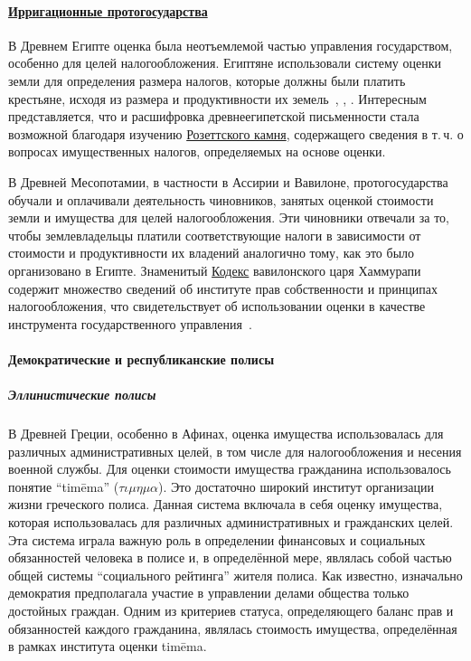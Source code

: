 \documentclass[12pt]{scrartcl}
\begin{document}
\paragraph{\href{https://en.wikipedia.org/wiki/Hydraulic_empire}{Ирригационные протогосударства}}
В Древнем Египте оценка была неотъемлемой частью управления государством, особенно для целей налогообложения. Египтяне использовали систему оценки земли для определения размера налогов, которые должны были платить крестьяне, исходя из размера и продуктивности их земель~\cite{hydraulic_empire}, \cite{Wittfogel1981}, \cite{Trigger1983}. Интересным представляется, что и расшифровка древнеегипетской письменности стала возможной благодаря изучению \href{https://en.wikipedia.org/wiki/Rosetta_Stone}{Розеттского камня}, содержащего сведения в т.\,ч. о вопросах имущественных налогов, определяемых на основе оценки.

В Древней Месопотамии, в частности в Ассирии и Вавилоне, протогосударства обучали и оплачивали деятельность чиновников, занятых оценкой стоимости земли и имущества для целей налогообложения. Эти чиновники отвечали за то, чтобы землевладельцы платили соответствующие налоги в зависимости от стоимости и продуктивности их владений аналогично тому, как это было организовано в Египте. Знаменитый \href{https://en.wikipedia.org/wiki/Code_of_Hammurabi}{Кодекс} вавилонского царя Хаммурапи содержит множество сведений об институте прав собственности и принципах налогообложения, что свидетельствует об использовании оценки в качестве инструмента государственного управления~\cite{NemetNejat1998}.

\paragraph{Демократические и республиканские полисы}

\subparagraph{Эллинистические полисы}
В Древней Греции, особенно в Афинах, оценка имущества использовалась для различных административных целей, в том числе для налогообложения и несения военной службы. Для оценки стоимости имущества гражданина использовалось понятие ``tim\={e}ma'' ($\tau\iota\mu\eta\mu\alpha$). Это достаточно широкий институт организации жизни греческого полиса. Данная система включала в себя оценку имущества, которая использовалась для различных административных и гражданских целей. Эта система играла важную роль в определении финансовых и социальных обязанностей человека в полисе и, в определённой мере, являлась собой частью общей системы ``социального рейтинга'' жителя полиса. Как известно, изначально демократия предполагала участие в управлении делами общества только достойных граждан. Одним из критериев статуса, определяющего баланс прав и обязанностей каждого гражданина, являлась стоимость имущества, определённая в рамках института оценки tim\={e}ma.
\end{document}
